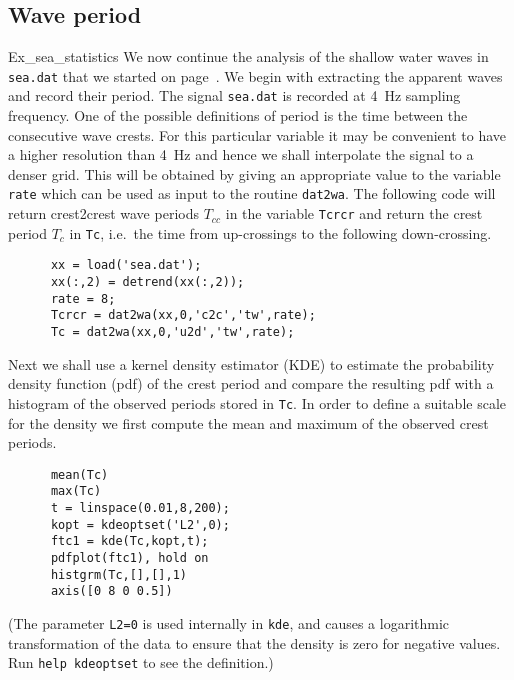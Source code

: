 \subsection{Wave period}
\begin{cex}{Ex_sea_statistics}
We now continue the analysis of the shallow water waves in {\tt sea.dat} that 
we started on page~\pageref{pageseadat}. 
We begin with extracting the apparent waves
 and record their period.
The signal  {\tt sea.dat} is recorded at 4~Hz sampling frequency.
One of the possible definitions of period is the time between the
consecutive wave crests. For this particular variable it may be
convenient to have a higher resolution than 4~Hz and hence we shall
interpolate the signal to a denser grid. This will be obtained by giving
an appropriate value to the variable {\tt rate} which can be used as input
to the \progname{} routine \verb+dat2wa+.
The following 
code will return crest2crest wave periods $T_{cc}$ in the variable
{\tt Tcrcr} and return the crest period $T_c$ in {\tt Tc}, i.e.\ the time from
up-crossings to the following down-crossing.
{\small\begin{verbatim}
      xx = load('sea.dat');
      xx(:,2) = detrend(xx(:,2));
      rate = 8;
      Tcrcr = dat2wa(xx,0,'c2c','tw',rate);
      Tc = dat2wa(xx,0,'u2d','tw',rate);
\end{verbatim}}

Next we shall use a kernel density estimator
(KDE) 
to estimate the probability density function (pdf)
of the crest period and compare the resulting pdf with a
histogram of the observed periods stored in {\tt Tc}.
In order to define a suitable scale for the density we first compute the
mean and maximum of the observed 
crest periods.
{\small\begin{verbatim}
      mean(Tc)
      max(Tc)
      t = linspace(0.01,8,200);
      kopt = kdeoptset('L2',0);
      ftc1 = kde(Tc,kopt,t);
      pdfplot(ftc1), hold on
      histgrm(Tc,[],[],1)
      axis([0 8 0 0.5])
\end{verbatim}}
\noindent
(The parameter {\tt L2=0}  is used internally in  {\tt kde}, and
causes a logarithmic transformation of the data to ensure that the density
is zero for negative values. Run \verb+help kdeoptset+ to see the definition.)


\end{cex}
